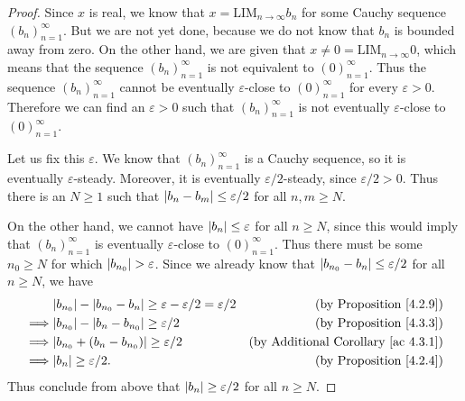 \begin{proof}
Since \(x\) is real, we know that \(x = \text{LIM}_{n \to \infty} b_n\) for some Cauchy sequence \((b_n)_{n = 1}^{\infty}\).
But we are not yet done, because we do not know that \(b_n\) is bounded away from zero.
On the other hand, we are given that \(x \neq 0 = \text{LIM}_{n \to \infty} 0\), which means that the sequence \((b_n)_{n = 1}^{\infty}\) is not equivalent to \((0)_{n = 1}^{\infty}\).
Thus the sequence \((b_n)_{n = 1}^{\infty}\) cannot be eventually \(\varepsilon\)-close to \((0)_{n = 1}^{\infty}\) for every \(\varepsilon > 0\).
Therefore we can find an \(\varepsilon > 0\) such that \((b_n)_{n = 1}^{\infty}\) is not eventually \(\varepsilon\)-close to \((0)_{n = 1}^{\infty}\).

Let us fix this \(\varepsilon\).
We know that \((b_n)_{n = 1}^{\infty}\) is a Cauchy sequence, so it is eventually \(\varepsilon\)-steady.
Moreover, it is eventually \(\varepsilon / 2\)-steady, since \(\varepsilon / 2 > 0\).
Thus there is an \(N \geq 1\) such that \(\abs*{b_n - b_m} \leq \varepsilon / 2\) for all \(n, m \geq N\).

On the other hand, we cannot have \(\abs*{b_n} \leq \varepsilon\) for all \(n \geq N\), since this would imply that \((b_n)_{n = 1}^{\infty}\) is eventually \(\varepsilon\)-close to \((0)_{n = 1}^{\infty}\).
Thus there must be some \(n_0 \geq N\) for which \(\abs*{b_{n_0}} > \varepsilon\).
Since we already know that \(\abs*{b_{n_0} - b_n} \leq \varepsilon / 2\) for all \(n \geq N\), we have
\begin{align*}
& \abs*{b_{n_0}} - \abs*{b_{n_0} - b_n} \geq \varepsilon - \varepsilon / 2 = \varepsilon / 2 & \text{(by Proposition \ref{4.2.9})} \\
\implies & \abs*{b_{n_0}} - \abs*{b_n - b_{n_0}} \geq \varepsilon / 2 & \text{(by Proposition \ref{4.3.3})} \\
\implies & \abs*{b_{n_0} + (b_n - b_{n_0})} \geq \varepsilon / 2 & \text{(by Additional Corollary \ref{ac 4.3.1})} \\
\implies & \abs*{b_n} \geq \varepsilon / 2. & \text{(by Proposition \ref{4.2.4})} \\
\end{align*}
Thus conclude from above that \(\abs*{b_n} \geq \varepsilon / 2\) for all \(n \geq N\).


\end{proof}
